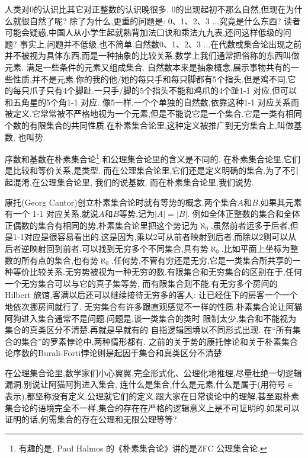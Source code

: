\documentclass[main.tex]{subfiles}
\begin{document}
人类对0的认识比其它对正整数的认识晚很多. 0的出现起初不那么自然,但现在为什么就很自然了呢?
除了为什么,更重的问题是: 0、1、2、3 ...究竟是什么东西?
读者可能会疑惑,中国人从小学生起就熟背加法口诀和乘法九九表,还问这样低级的问题?
事实上,问题并不低级,也不简单.自然数0、1、2、3 ...在代数或集合论出现之前并不被视为具体东西,而是一种抽象的比较关系.数学上我们通常把俗称的东西叫做元素.
满足一些条件的元素又组成集合.
自然数本来是抽象概念,展示事物共有的一些性质,并不是元素.你的我的他/她的每只手和每只脚都有5个指头.但是鸡不同,它的每只爪子只有4个脚趾.一只手/脚的5个指头不能和鸡爪的4个趾1-1 对应,但可以和五角星的5个角1-1 对应.
像5一样,一个个单独的自然数,依靠这种1-1 对应关系而被定义.它常常被不严格地视为一个元素,但是不能说它是一个集合.它是一类有相同个数的有限集合的共同性质.在朴素集合论里,这种定义被推广到无穷集合上,叫做基数, 也叫势.

序数和基数在朴素集合论\footnote{有趣的是, Paul Halmos 的《朴素集合论》\cite{HalmosP}讲的是ZFC 公理集合论.}
和公理集合论里的含义是不同的. 
在朴素集合论里,它们是比较和等价关系,是类型.
而在公理集合论里,它们还是定义明确的集合.为了不引起混淆,在公理集合论里,
我们的说基数,
而在朴素集合论里,我们说势.

康托(Georg Cantor)创立朴素集合论时就有等势的概念.两个集合$A$和$B$,如果其元素有一个 1-1 对应关系,就说$A$和$B$等势,记为$|A|=|B|$.
例如全体正整数的集合和全体正偶数的集合有相同的势,朴素集合论里把这个势记为$\aleph_0$.虽然前者远多于后者,但是1-1对应是很容易看出的.这是因为,乘以2可从前者映射到后者,而除以2则可以从后者逆映射回到前者.可以找到无穷多个不同集合,具有势$\aleph_0$.比如平面上坐标为整数的所有点的集合,也有势$\aleph_0$.任何势,不管有穷还是无穷,它是一类集合所共享的一种等价比较关系.无穷势被视为一种无穷的数.有限集合和无穷集合的区别在于,任何一个无穷集合可以与它的真子集等势, 而有限集合则不能.有无穷多个房间的Hilbert 旅馆,客满以后还可以继续接待无穷多的客人: 让已经住下的房客一个一个地依次挪房间就行了.
无穷集合有许多跟直观感觉不一样的性质.朴素集合论让阿猫阿狗进入集合通常不是问题.问题是,谈一类集合的类时
限制太少,集合和不能视为集合的真类区分不清楚.再就是早就有的
自指逻辑困境以不同形式出现.
在“所有集合的集合”的罗素悖论中,两种情形都有.
之前的关于势的康托悖论和关于朴素集合论序数的Burali-Forti悖论则是起因于集合和真类区分不清楚.

在公理集合论里,数学家们小心翼翼,完全形式化、公理化地推理,尽量杜绝一切逻辑漏洞.别说让阿猫阿狗进入集合, 连什么是集合,什么是元素,什么是属于(用符号$\in$表示),都坚称没有定义,公理就它们的定义.跟大家在日常谈论中的理解,甚至跟朴素集合论的语境完全不一样,集合的存在在严格的逻辑意义上是不可证明的.如果可以证明的话,何需集合的存在公理和无限公理等等?
\end{document}
